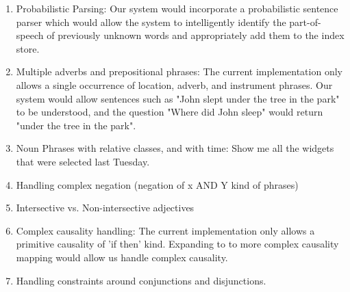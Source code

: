 \documentclass[10pt]{article}
\begin{document}
\begin{enumerate}
\item{
Probabilistic Parsing: Our system would incorporate a probabilistic sentence parser which would allow the system to intelligently identify the part-of-speech of previously unknown words and appropriately add them to the index store.
}

\item{
Multiple adverbs and prepositional phrases: The current implementation only allows a single occurrence of location, adverb, and instrument phrases. Our system would allow sentences such as "John slept under the tree in the park" to be understood, and the question "Where did John sleep" would return "under the tree in the park".
}

\item{
Noun Phrases with relative classes, and with time:  Show me all the widgets that were selected last Tuesday.
}

\item{
Handling complex negation (negation of x AND Y kind of phrases)
}

\item{
Intersective vs. Non-intersective adjectives
}

\item{
Complex causality handling: The current implementation only allows a primitive causality of 'if then' kind. Expanding to to more complex causality mapping would allow us handle complex causality.
}

\item{
Handling constraints around conjunctions and disjunctions.
}

\end{enumerate}



 
\end{document}
